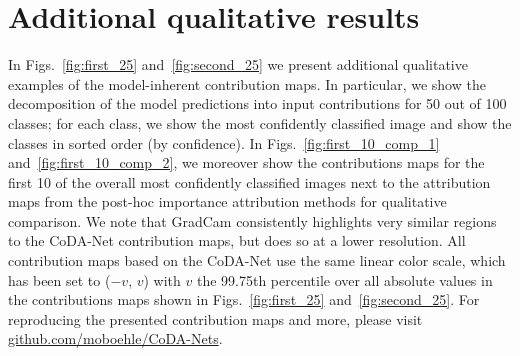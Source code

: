 \section{Additional qualitative results}
\label{sec:additional_figures}

 In Figs.~\ref{fig:first_25} and~\ref{fig:second_25} we present additional qualitative examples of the model-inherent contribution maps. In particular, we show the decomposition of the model predictions into input contributions for 50 out of 100 classes; for each class, we show the most confidently classified image and show the classes in sorted order (by confidence). In Figs.~\ref{fig:first_10_comp_1} and~\ref{fig:first_10_comp_2}, we moreover show the contributions maps for the first 10 of the overall most confidently classified images next to the attribution maps from the post-hoc importance attribution methods for qualitative comparison. We note that GradCam consistently highlights very similar regions to the CoDA-Net contribution maps, but does so at a lower resolution. All contribution maps based on the CoDA-Net use the same linear color scale, which has been set to ($-v$, $v$) with $v$ the 99.75th percentile over all absolute values in the contributions maps shown in Figs.~\ref{fig:first_25} and~\ref{fig:second_25}. For reproducing the presented contribution maps and more, please visit \url{github.com/moboehle/CoDA-Nets}.

\begin{figure*}[t]
    \centering
    \caption{The first 25 most confident classifications decomposed into the contributions from each spatial location, filtered to 1 image per class. Positive (negative) contributions for the ground truth class are shown in red (blue).}
    \label{fig:first_25}
    \vspace{-1em}
\end{figure*}

\begin{figure*}[t]
    \centering
    \caption{The 26th to the 50th most confident classifications decomposed into the contributions from each spatial location, filtered to 1 image per class. Positive (negative) contributions for the ground truth class are shown in red (blue).}
    \label{fig:second_25}
\end{figure*}

